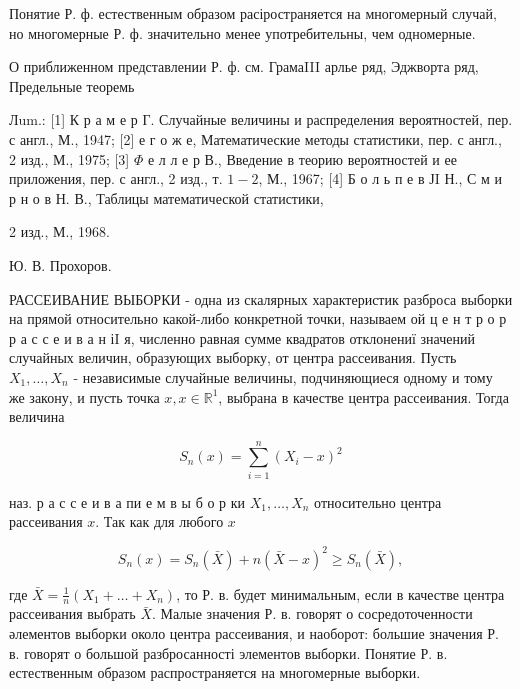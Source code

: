 \documentclass[10pt]{article}
\begin{document}
Понятие Р. ф. естественным образом расіространяется на многомерный случай, но многомерные Р. ф. значительно менее употребительны, чем одномерные.



О приближенном представлении Р. ф. см. ГрамаIII арлье ряд, Эджворта ряд, Предельные теоремь



Лum.: [1] К р а м е р Г. Случайные величины и распределения вероятностей, пер. с англ., М., 1947; [2] е г о ж е, Математические методы статистики, пер. с англ., 2 изд., М., 1975; [3] $\Phi$ е л л е р В., Введение в теорию вероятностей и ее приложения, пер. с англ., 2 изд., т. $1-2$, М., 1967; [4] Б о л ь п е в ЈI Н., С м и р н о в Н. В., Таблицы математической статистики,

2 изд., М., 1968.

Ю. В. Прохоров.



РАССЕИВАНИЕ ВЫБОРКИ - одна из скалярных характеристик разброса выборки на прямой относительно какой-либо конкретной точки, называем ой ц е н т р о р р а с с е и в а н іI я, численно равная сумме квадратов отклонениї значений случайных величин, образующих выборку, от центра рассеивания. Пусть $X_{1}, \ldots, X_{n}$ - независимые случайные величины, подчиняющиеся одному и тому же закону, и пусть точка $x, x \in \mathbb{R}^{1}$, выбрана в качестве центра рассеивания. Тогда величина



\[

S_{n}(x)=\sum_{i=1}^{n}\left(X_{i}-x\right)^{2}

\]



наз. р а с с е и в а пи е м в ы б о р ки $X_{1}, \ldots, X_{n}$ относительно центра рассеивания $x$. Так как для любого $x$



\[

S_{n}(x)=S_{n}(\bar{X})+n(\bar{X}-x)^{2} \geqslant S_{n}(\bar{X}),

\]



где $\bar{X}=\frac{1}{n}\left(X_{1}+\ldots+X_{n}\right)$, то Р. в. будет минимальным, если в качестве центра рассеивания выбрать $\bar{X}$. Малые значения Р. в. говорят о сосредоточенности әлементов выборки около центра рассеивания, и наоборот: большие значения Р. в. говорят о большой разбросанності элементов выборки. Понятие Р. в. естественным образом распространяется на многомерные выборки.
\end{document}
